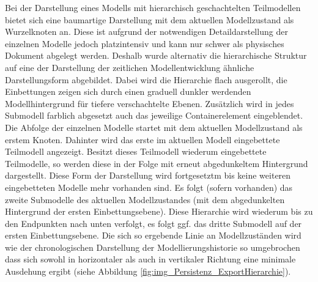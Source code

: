 Bei der Darstellung eines Modells mit hierarchisch geschachtelten Teilmodellen bietet sich eine baumartige Darstellung mit dem aktuellen Modellzustand als Wurzelknoten an. Diese ist aufgrund der notwendigen Detaildarstellung der einzelnen Modelle jedoch platzintensiv und kann nur schwer als physisches Dokument abgelegt werden. Deshalb wurde alternativ die hierarchische Struktur auf eine der Darstellung der zeitlichen Modellentwicklung ähnliche Darstellungsform abgebildet. Dabei wird die Hierarchie flach ausgerollt, die Einbettungen zeigen sich durch einen graduell dunkler werdenden Modellhintergrund für tiefere verschachtelte Ebenen. Zusätzlich wird in jedes Submodell farblich abgesetzt auch das jeweilige Containerelement eingeblendet. Die Abfolge der einzelnen Modelle startet mit dem aktuellen Modellzustand als erstem Knoten. Dahinter wird das erste im aktuellen Modell eingebettete Teilmodell angezeigt. Besitzt dieses Teilmodell wiederum eingebettete Teilmodelle, so werden diese in der Folge mit erneut abgedunkeltem Hintergrund dargestellt. Diese Form der Darstellung wird fortgesetztm bis keine weiteren eingebetteten Modelle mehr vorhanden sind. Es folgt (sofern vorhanden) das zweite Submodelle des aktuellen Modellzustandes (mit dem abgedunkelten Hintergrund der ersten Einbettungsebene). Diese Hierarchie wird wiederum bis zu den Endpunkten nach unten verfolgt, es folgt ggf. das dritte Submodell auf der ersten Einbettungsebene. Die sich so ergebende Linie an Modellzuständen wird wie der chronologischen Darstellung der Modellierungshistorie so umgebrochen dass sich sowohl in horizontaler als auch in vertikaler Richtung eine minimale Ausdehung ergibt (siehe Abbildung \ref{fig:img_Persistenz_ExportHierarchie}).


